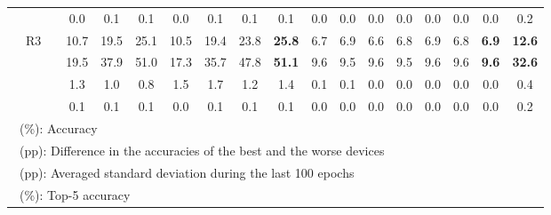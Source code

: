 \documentclass[journal]{IEEEtran}
\begin{document}
\begin{table*}[!t]
\begin{tabular}{cccccccccccccccccc}
 & &   &  0.0 &  0.1 &  0.1 &  0.0 &  0.1 &  0.1 &           0.1 &  0.0 &  0.0 &  0.0 &  0.0 &  0.0 &  0.0 &           0.0 & 0.2  \\
\cmidrule{2-18}
& \multirow{4}{*}{R3}
   &   & 10.7 & 19.5 & 25.1 & 10.5 & 19.4 & 23.8 & \textbf{25.8} &  6.7 &  6.9 &  6.6 &  6.8 &  6.9 &  6.8 &  \textbf{6.9} & \textbf{12.6} \\
 & &  & 19.5 & 37.9 & 51.0 & 17.3 & 35.7 & 47.8 & \textbf{51.1} &  9.6 &  9.5 &  9.6 &  9.5 &  9.6 &  9.6 &  \textbf{9.6} & \textbf{32.6} \\
 & &  &  1.3 &  1.0 &  0.8 &  1.5 &  1.7 &  1.2 &           1.4 &  0.1 &  0.1 &  0.0 &  0.0 &  0.0 &  0.0 &           0.0 & 0.4  \\
 & &   &  0.1 &  0.1 &  0.1 &  0.0 &  0.1 &  0.1 &           0.1 &  0.0 &  0.0 &  0.0 &  0.0 &  0.0 &  0.0 &           0.0 & 0.2  \\
\bottomrule
\multicolumn{18}{l}{\ (\%): Accuracy}\\
\multicolumn{18}{l}{\ (pp): Difference in the accuracies of the best and the worse devices}\\
\multicolumn{18}{l}{\ (pp): Averaged standard deviation during the last 100 epochs}\\
\multicolumn{18}{l}{\ (\%): Top-5 accuracy}
\end{tabular}
\end{table*}
\end{document}
